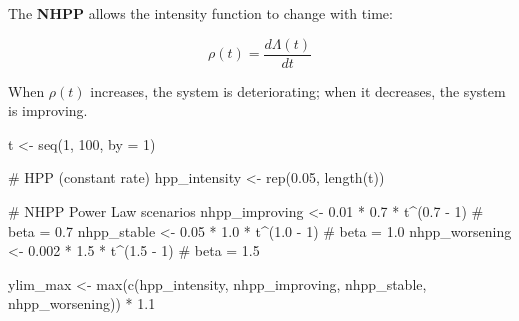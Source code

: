 \documentclass[
  letterpaper,
  DIV=11,
  numbers=noendperiod]{scrreprt}
\newenvironment{Shaded}{\begin{snugshade}}{\end{snugshade}}
\newcommand{\AttributeTok}[1]{\textcolor[rgb]{0.40,0.45,0.13}{#1}}
\newcommand{\CommentTok}[1]{\textcolor[rgb]{0.37,0.37,0.37}{#1}}
\newcommand{\DecValTok}[1]{\textcolor[rgb]{0.68,0.00,0.00}{#1}}
\newcommand{\FloatTok}[1]{\textcolor[rgb]{0.68,0.00,0.00}{#1}}
\newcommand{\FunctionTok}[1]{\textcolor[rgb]{0.28,0.35,0.67}{#1}}
\newcommand{\NormalTok}[1]{\textcolor[rgb]{0.00,0.23,0.31}{#1}}
\newcommand{\OtherTok}[1]{\textcolor[rgb]{0.00,0.23,0.31}{#1}}
\newcommand{\SpecialCharTok}[1]{\textcolor[rgb]{0.37,0.37,0.37}{#1}}
\begin{document}
The \textbf{NHPP} allows the intensity function to change with time:

\[\rho(t) = \frac{d\Lambda(t)}{dt}\]

When \(\rho(t)\) increases, the system is deteriorating; when it
decreases, the system is improving.

\begin{Shaded}
\begin{Highlighting}[]
\NormalTok{t }\OtherTok{\textless{}{-}} \FunctionTok{seq}\NormalTok{(}\DecValTok{1}\NormalTok{, }\DecValTok{100}\NormalTok{, }\AttributeTok{by =} \DecValTok{1}\NormalTok{)}

\CommentTok{\# HPP (constant rate)}
\NormalTok{hpp\_intensity  }\OtherTok{\textless{}{-}} \FunctionTok{rep}\NormalTok{(}\FloatTok{0.05}\NormalTok{, }\FunctionTok{length}\NormalTok{(t))}

\CommentTok{\# NHPP Power Law scenarios}
\NormalTok{nhpp\_improving  }\OtherTok{\textless{}{-}} \FloatTok{0.01} \SpecialCharTok{*} \FloatTok{0.7} \SpecialCharTok{*}\NormalTok{ t}\SpecialCharTok{\^{}}\NormalTok{(}\FloatTok{0.7} \SpecialCharTok{{-}} \DecValTok{1}\NormalTok{)   }\CommentTok{\# beta = 0.7}
\NormalTok{nhpp\_stable     }\OtherTok{\textless{}{-}} \FloatTok{0.05} \SpecialCharTok{*} \FloatTok{1.0} \SpecialCharTok{*}\NormalTok{ t}\SpecialCharTok{\^{}}\NormalTok{(}\FloatTok{1.0} \SpecialCharTok{{-}} \DecValTok{1}\NormalTok{)   }\CommentTok{\# beta = 1.0}
\NormalTok{nhpp\_worsening  }\OtherTok{\textless{}{-}} \FloatTok{0.002} \SpecialCharTok{*} \FloatTok{1.5} \SpecialCharTok{*}\NormalTok{ t}\SpecialCharTok{\^{}}\NormalTok{(}\FloatTok{1.5} \SpecialCharTok{{-}} \DecValTok{1}\NormalTok{)  }\CommentTok{\# beta = 1.5}

\NormalTok{ylim\_max }\OtherTok{\textless{}{-}} \FunctionTok{max}\NormalTok{(}\FunctionTok{c}\NormalTok{(hpp\_intensity, nhpp\_improving, nhpp\_stable, nhpp\_worsening)) }\SpecialCharTok{*} \FloatTok{1.1}


\end{Highlighting}
\end{Shaded}
\end{document}
